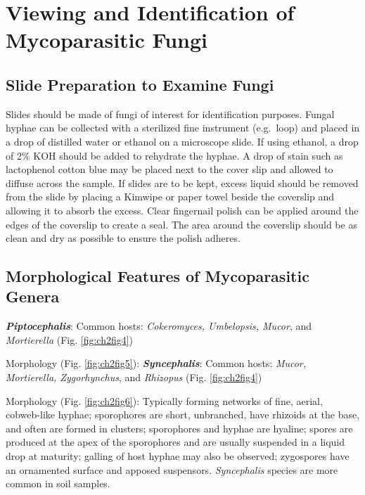 \documentclass[]{book}
\begin{document}
\section{Viewing and Identification of Mycoparasitic
Fungi}\label{viewing-and-identification-of-mycoparasitic-fungi}

\subsection{Slide Preparation to Examine
Fungi}\label{slide-preparation-to-examine-fungi}

Slides should be made of fungi of interest for identification purposes.
Fungal hyphae can be collected with a sterilized fine instrument
(e.g.~loop) and placed in a drop of distilled water or ethanol on a
microscope slide. If using ethanol, a drop of 2\% KOH should be added to
rehydrate the hyphae. A drop of stain such as lactophenol cotton blue
may be placed next to the cover slip and allowed to diffuse across the
sample. If slides are to be kept, excess liquid should be removed from
the slide by placing a Kimwipe or paper towel beside the coverslip and
allowing it to absorb the excess. Clear fingernail polish can be applied
around the edges of the coverslip to create a seal. The area around the
coverslip should be as clean and dry as possible to ensure the polish
adheres.

\subsection{Morphological Features of Mycoparasitic
Genera}\label{morphological-features-of-mycoparasitic-genera}

\textbf{\emph{Piptocephalis}}: Common hosts: \emph{Cokeromyces,
Umbelopsis, Mucor}, and \emph{Mortierella} (Fig. \ref{fig:ch2fig4})

Morphology (Fig. \ref{fig:ch2fig5}): \textbf{\emph{Syncephalis}}: Common
hosts: \emph{Mucor, Mortierella, Zygorhynchus}, and \emph{Rhizopus}
(Fig. \ref{fig:ch2fig4})

Morphology (Fig. \ref{fig:ch2fig6}): Typically forming networks of fine,
aerial, cobweb-like hyphae; sporophores are short, unbranched, have
rhizoids at the base, and often are formed in clusters; sporophores and
hyphae are hyaline; spores are produced at the apex of the sporophores
and are usually suspended in a liquid drop at maturity; galling of host
hyphae may also be observed; zygospores have an ornamented surface and
apposed suspensors. \emph{Syncephalis} species are more common in soil
samples.
\end{document}

